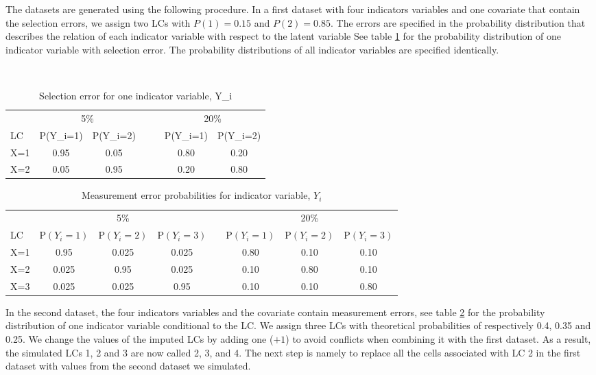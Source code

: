 \documentclass[a4paper, 11pt]{article} %
\begin{document}
The datasets are generated using the following procedure. In a first dataset with four indicators variables and one covariate that contain the selection errors, we assign two LCs with $P(1)=0.15$ and $P(2)=0.85$. The errors are specified in the probability distribution that describes the relation of each indicator variable with respect to the latent variable
See table \ref{tab:selectionerror} for the probability distribution of one indicator variable with selection error. The probability distributions of all indicator variables are specified identically. 

\begin{table}[t]
\centering
\caption{Selection error for one indicator variable, Y_i}\\
\vspace{1}
\begin{tabular}{l cc l  l cc}
 \hline
& \multicolumn{2}{c}{5\%} &&&  \multicolumn{2}{c}{20\%}  \\
  \cline{2-3}
  \cline{6-7}
 LC & P(Y_i=1) & P(Y_i=2)  &&&   P(Y_i=1) & P(Y_i=2)  \\ 
  \hline
 X=1  & 0.95 & 0.05 &&& 0.80 & 0.20  \\ 
  X=2 & 0.05 & 0.95 &&& 0.20 & 0.80  \\ 
  \hline
  \end{tabular}
  \label{tab:selectionerror}
\end{table}



\begin{table}[t]
\caption{Measurement error probabilities for indicator variable, $Y_i$}
\centering
\begin{tabular}{l ccc r ccc }
 \hline
   &  \multicolumn{3}{c}{5\%} && \multicolumn{3}{c}{20\%} \\
 \cline{2-4} 
 \cline{6-8}
 LC & P$(Y_i=1)$ & P$(Y_i=2)$ & P$(Y_i=3)$ &&  P$(Y_i=1)$ & P$(Y_i=2)$ & P$(Y_i=3)$\\ 
  \hline
  X=1 & 0.95 & 0.025 & 0.025 &&0.80 & 0.10 & 0.10\\ 
  X=2 & 0.025 & 0.95 & 0.025 &&0.10 & 0.80 & 0.10\\ 
  X=3 & 0.025 & 0.025 & 0.95 &&0.10 & 0.10 & 0.80 \\ 
  \hline
  \end{tabular}
  \label{tab:measurementerror}
\end{table}


In the second dataset, the four indicators variables and the covariate contain measurement errors, see table \ref{tab:measurementerror} for the probability distribution of one indicator variable conditional to the LC. We assign three LCs with theoretical probabilities of respectively 0.4, 0.35 and 0.25. We change the values of the imputed LCs by adding one ($+1$) to avoid conflicts when combining it with the first dataset. As a result, the simulated LCs 1, 2 and 3 are now called 2, 3, and 4. The next step is namely to replace all the cells associated with LC 2 in the first dataset with values from the second dataset we simulated. 
\end{document}
